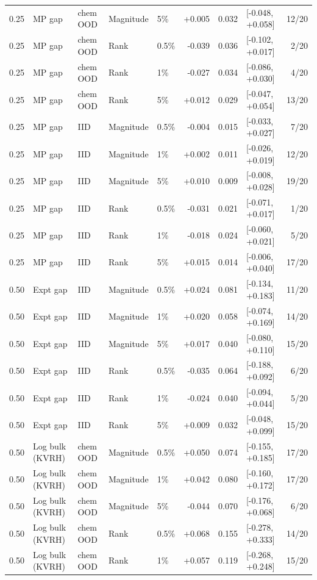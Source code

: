 \begin{longtable}{@{}lllllrrlr@{}}
0.25 & MP gap & chem OOD & Magnitude & 5\% & +0.005 & 0.032 & [-0.048, +0.058] & 12/20 \\
0.25 & MP gap & chem OOD & Rank & 0.5\% & -0.039 & 0.036 & [-0.102, +0.017] & 2/20 \\
0.25 & MP gap & chem OOD & Rank & 1\% & -0.027 & 0.034 & [-0.086, +0.030] & 4/20 \\
0.25 & MP gap & chem OOD & Rank & 5\% & +0.012 & 0.029 & [-0.047, +0.054] & 13/20 \\
0.25 & MP gap & IID & Magnitude & 0.5\% & -0.004 & 0.015 & [-0.033, +0.027] & 7/20 \\
0.25 & MP gap & IID & Magnitude & 1\% & +0.002 & 0.011 & [-0.026, +0.019] & 12/20 \\
0.25 & MP gap & IID & Magnitude & 5\% & +0.010 & 0.009 & [-0.008, +0.028] & 19/20 \\
0.25 & MP gap & IID & Rank & 0.5\% & -0.031 & 0.021 & [-0.071, +0.017] & 1/20 \\
0.25 & MP gap & IID & Rank & 1\% & -0.018 & 0.024 & [-0.060, +0.021] & 5/20 \\
0.25 & MP gap & IID & Rank & 5\% & +0.015 & 0.014 & [-0.006, +0.040] & 17/20 \\
0.50 & Expt gap & IID & Magnitude & 0.5\% & +0.024 & 0.081 & [-0.134, +0.183] & 11/20 \\
0.50 & Expt gap & IID & Magnitude & 1\% & +0.020 & 0.058 & [-0.074, +0.169] & 14/20 \\
0.50 & Expt gap & IID & Magnitude & 5\% & +0.017 & 0.040 & [-0.080, +0.110] & 15/20 \\
0.50 & Expt gap & IID & Rank & 0.5\% & -0.035 & 0.064 & [-0.188, +0.092] & 6/20 \\
0.50 & Expt gap & IID & Rank & 1\% & -0.024 & 0.040 & [-0.094, +0.044] & 5/20 \\
0.50 & Expt gap & IID & Rank & 5\% & +0.009 & 0.032 & [-0.048, +0.099] & 15/20 \\
0.50 & Log bulk (KVRH) & chem OOD & Magnitude & 0.5\% & +0.050 & 0.074 & [-0.155, +0.185] & 17/20 \\
0.50 & Log bulk (KVRH) & chem OOD & Magnitude & 1\% & +0.042 & 0.080 & [-0.160, +0.172] & 17/20 \\
0.50 & Log bulk (KVRH) & chem OOD & Magnitude & 5\% & -0.044 & 0.070 & [-0.176, +0.068] & 6/20 \\
0.50 & Log bulk (KVRH) & chem OOD & Rank & 0.5\% & +0.068 & 0.155 & [-0.278, +0.333] & 14/20 \\
0.50 & Log bulk (KVRH) & chem OOD & Rank & 1\% & +0.057 & 0.119 & [-0.268, +0.248] & 15/20 \\

\end{longtable}
